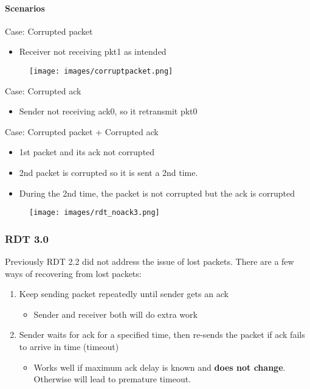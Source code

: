 \documentclass[a4paper]{article}
\begin{document}
\paragraph{Scenarios}\mbox{}

\medskip
\noindent Case: Corrupted packet
\begin{itemize}
    \item Receiver not receiving pkt1 as intended
\end{itemize}
\begin{figure}[H]
    \centering
    \texttt{[image: images/corruptpacket.png]}
\end{figure}

\noindent Case: Corrupted ack
\begin{itemize}
    \item Sender not receiving ack0, so it retransmit pkt0
\end{itemize}
Case: Corrupted packet + Corrupted ack
\begin{itemize}
    \item 1st packet and its ack not corrupted
    \item 2nd packet is corrupted so it is sent a 2nd time.
    \item During the 2nd time, the packet is not corrupted but the ack is corrupted
\end{itemize}
\begin{figure}[H]
    \centering
    \texttt{[image: images/rdt\_noack3.png]}
\end{figure}

\subsubsection{RDT 3.0}
Previously RDT 2.2 did not address the issue of lost packets. There are a few ways of recovering from lost packets:
\begin{enumerate}
    \item Keep sending packet repeatedly until sender gets an ack
    \begin{itemize}[label=$\circ$]
        \item Sender and receiver both will do extra work
    \end{itemize}
    \item Sender waits for ack for a specified time, then re-sends the packet if ack fails to arrive in time (timeout)
    \begin{itemize}[label=$\circ$]
        \item Works well if maximum ack delay is known and \textbf{does not change}. Otherwise will lead to premature timeout.
    \end{itemize}
\end{enumerate}
\end{document}

